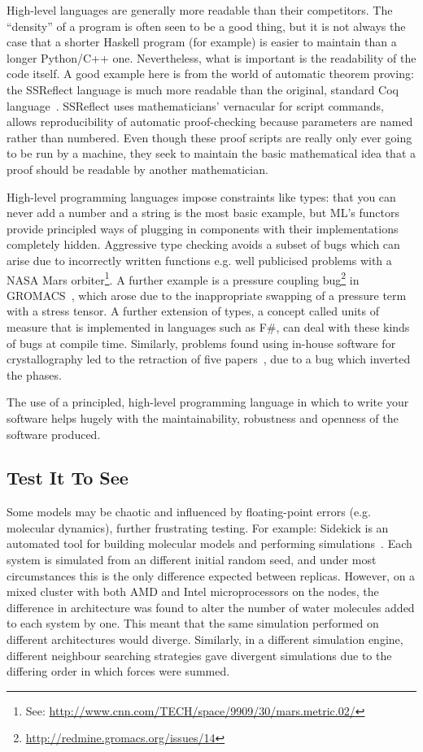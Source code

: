 \documentclass[10pt,conference,final]{IEEEtran}
\begin{document}
High-level languages are generally more readable than their
competitors. The ``density'' of a program is often seen to be a good
thing, but it is not always the case that a shorter Haskell program
(for example) is easier to maintain than a longer Python/C++
one. Nevertheless, what is important is the readability of the code
itself. A good example here is from the world of automatic theorem
proving: the SSReflect language is much more readable than the
original, standard Coq language~\cite{GonthierZND13}. SSReflect uses
mathematicians' vernacular for script commands, allows reproducibility
of automatic proof-checking because parameters are named rather than
numbered.  Even though these proof scripts are really only ever going
to be run by a machine, they seek to maintain the basic mathematical
idea that a proof should be readable by another mathematician.

High-level programming languages impose constraints like types: that you can
never add a number and a string is the most basic example, but ML's
functors provide principled ways of plugging in components with their
implementations completely hidden. Aggressive type checking avoids a
subset of bugs which can arise due to incorrectly written functions
e.g. well publicised problems with a NASA Mars orbiter\footnote{See:
\url{http://www.cnn.com/TECH/space/9909/30/mars.metric.02/}}.  A
further example is a pressure coupling
bug\footnote{\url{http://redmine.gromacs.org/issues/14}} in
GROMACS~\cite{Hess2008}, which arose due to the inappropriate swapping
of a pressure term with a stress tensor.  A further extension of
types, a concept called units of measure that is implemented in
languages such as F\#, can deal with these kinds of bugs at compile
time. Similarly, problems found using in-house software for
crystallography led to the retraction of five
papers~\cite{Miller2006}, due to a bug which inverted the phases.

 The use of a
principled, high-level programming language in which to write your
software helps hugely with the maintainability, robustness and
openness of the software produced.

\subsection{Test It To See}

Some models may be chaotic and influenced by floating-point errors
(e.g. molecular dynamics), further frustrating testing. For example:
Sidekick is an automated tool for building molecular models and
performing simulations~\cite{Hall2014Sidekick}. Each system is
simulated from an different initial random seed, and under most
circumstances this is the only difference expected between
replicas. However, on a mixed cluster with both AMD and Intel
microprocessors on the nodes, the difference in architecture was found
to alter the number of water molecules added to each system by
one. This meant that the same simulation performed on different
architectures would diverge. Similarly, in a different simulation
engine, different neighbour searching strategies gave divergent
simulations due to the differing order in which forces were summed.
\end{document}
